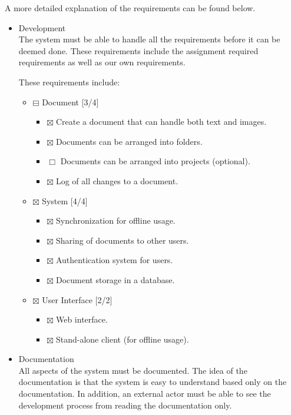 \documentclass[11pt]{article}
\begin{document}
A more detailed explanation of the requirements can be found below.
\begin{itemize}

\item Development\\
\label{sec-5-1-1-1}%
The system must be able to handle all the requirements before it can be deemed done.
These requirements include the assignment required requirements as well as our
own requirements.

These requirements include:
\begin{itemize}
\item $\boxminus$ Document [3/4]
\begin{itemize}
\item $\boxtimes$ Create a document that can handle both text and images.
\item $\boxtimes$ Documents can be arranged into folders.
\item $\Box$ Documents can be arranged into projects (optional).
\item $\boxtimes$ Log of all changes to a document.
\end{itemize}
\item $\boxtimes$ System [4/4]
\begin{itemize}
\item $\boxtimes$ Synchronization for offline usage.
\item $\boxtimes$ Sharing of documents to other users.
\item $\boxtimes$ Authentication system for users.
\item $\boxtimes$ Document storage in a database.
\end{itemize}
\item $\boxtimes$ User Interface [2/2]
\begin{itemize}
\item $\boxtimes$ Web interface.
\item $\boxtimes$ Stand-alone client (for offline usage).
\end{itemize}
\end{itemize}


\item Documentation\\
\label{sec-5-1-1-2}%
All aspects of the system must be documented.
The idea of the documentation is that the system is easy to understand based only on
the documentation. In addition, an external actor must be able to see the development
process from reading the documentation only.


\end{itemize}
\end{document}
